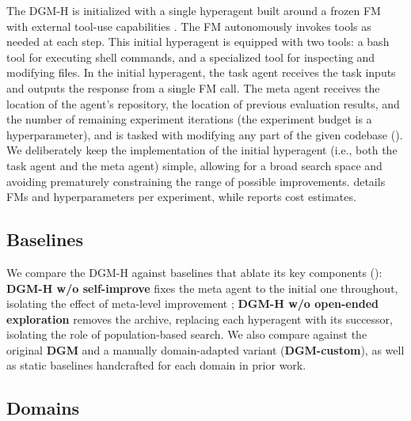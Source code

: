 \documentclass{article}
\begin{document}
The DGM-H is initialized with a single hyperagent built around a frozen FM \citep{brown2020language} with external tool-use capabilities \citep{schick2023toolformer}. The FM autonomously invokes tools as needed at each step. This initial hyperagent is equipped with two tools: a bash tool for executing shell commands, and a specialized tool for inspecting and modifying files. In the initial hyperagent, the task agent receives the task inputs and outputs the response from a single FM call. The meta agent receives the location of the agent's repository, the location of previous evaluation results, and the number of remaining experiment iterations (the experiment budget is a hyperparameter), and is tasked with modifying any part of the given codebase (). We deliberately keep the implementation of the initial hyperagent (i.e., both the task agent and the meta agent) simple, allowing for a broad search space and avoiding prematurely constraining the range of possible improvements.  details FMs and hyperparameters per experiment, while  reports cost estimates.

\vspace{-0.5em}
\subsection{Baselines}
\label{sec:baselines}
\vspace{-0.5em}

We compare the DGM-H against baselines that ablate its key components (): \textbf{DGM-H w/o self-improve} fixes the meta agent to the initial one throughout, isolating the effect of meta-level improvement \citep{huautomated}; \textbf{DGM-H w/o open-ended exploration} removes the archive, replacing each hyperagent with its successor, isolating the role of population-based search. We also compare against the original \textbf{DGM} \citep{zhang2025darwin} and a manually domain-adapted variant (\textbf{DGM-custom}), as well as static baselines handcrafted for each domain in prior work.

\vspace{-0.5em}
\subsection{Domains}
\label{sec:domains}
\vspace{-0.5em}
\end{document}
